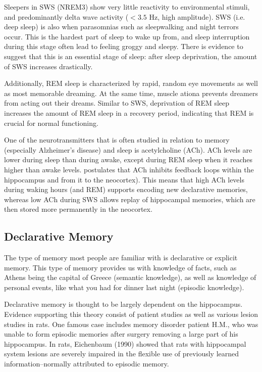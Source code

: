 \documentclass[10pt,letterpaper]{article}
\begin{document}
Sleepers in SWS (NREM3) show very little reactivity to environmental stimuli, and predominantly delta wave activity ($<3.5$ Hz, high amplitude). SWS (i.e. deep sleep) is also when parasomnias such as sleepwalking and night terrors occur. This is the hardest part of sleep to wake up from, and sleep interruption during this stage often lead to feeling groggy and sleepy. There is evidence to suggest that this is an essential stage of sleep: after sleep deprivation, the amount of SWS increases drastically.

Additionally, REM sleep is characterized by rapid, random eye movements as well as most memorable dreaming. At the same time, muscle ationa prevents dreamers from acting out their dreams. Similar to SWS, deprivation of REM sleep increases the amount of REM sleep in a recovery period, indicating that REM is crucial for normal functioning.

One of the neurotransmitters that is often studied in relation to memory (especially Alzheimer's disease) and sleep is acetylcholine (ACh). ACh levels are lower during sleep than during awake, except during REM sleep when it reaches higher than awake levels.  postulates that ACh inhibits feedback loops within the hippocampus and from it to the neocortex). This means that high ACh levels during waking hours (and REM) supports encoding new declarative memories, whereas low ACh during SWS allows replay of hippocampal memories, which are then stored more permanently in the neocortex.


\subsection{Declarative Memory}

The type of memory most people are familiar with is declarative or explicit memory. This type of memory provides us with knowledge of facts, such as Athens being the capital of Greece (semantic knowledge), as well as knowledge of personal events, like what you had for dinner last night (episodic knowledge). 

Declarative memory is thought to be largely dependent on the hippocampus. Evidence supporting this theory consist of patient studies as well as various lesion studies in rats. One famous case includes memory disorder patient H.M., who was unable to form episodic memories after surgery removing a large part of his hippocampus. In rats, Eichenbaum (1990) showed that rats with hippocampal system lesions are severely impaired in the flexible use of previously learned information--normally attributed to episodic memory.
\end{document}
